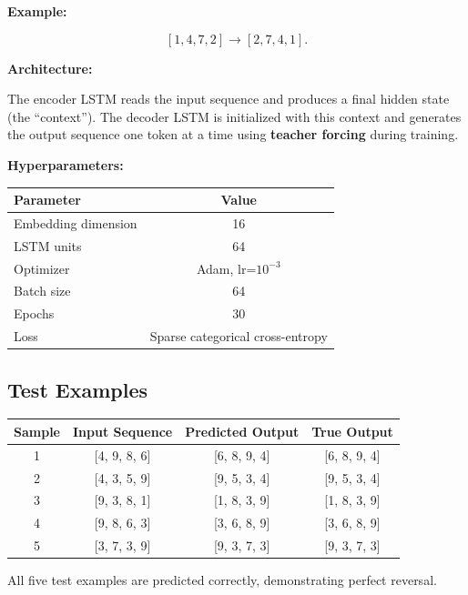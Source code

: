 \documentclass[10pt]{article}
\begin{document}
\textbf{Example:}

\[
[1,4,7,2] \rightarrow [2,7,4,1].
\]

\textbf{Architecture:}

The encoder LSTM reads the input sequence and produces a final hidden state (the ``context''). 
The decoder LSTM is initialized with this context and generates the output sequence one token at a time 
using \textbf{teacher forcing} during training.

\textbf{Hyperparameters:}

\begin{center}
\begin{tabular}{|l|c|}
\hline
\textbf{Parameter} & \textbf{Value}\\
\hline
Embedding dimension & 16\\
LSTM units & 64\\
Optimizer & Adam, lr=$10^{-3}$\\
Batch size & 64\\
Epochs & 30\\
Loss & Sparse categorical cross-entropy\\
\hline
\end{tabular}
\end{center}

\vspace{3mm}


\subsection*{Test Examples}

\begin{center}
\begin{tabular}{|c|c|c|c|}
\hline
\textbf{Sample} & \textbf{Input Sequence} & \textbf{Predicted Output} & \textbf{True Output}\\
\hline
1 & [4, 9, 8, 6] & [6, 8, 9, 4] & [6, 8, 9, 4]\\
2 & [4, 3, 5, 9] & [9, 5, 3, 4] & [9, 5, 3, 4]\\
3 & [9, 3, 8, 1] & [1, 8, 3, 9] & [1, 8, 3, 9]\\
4 & [9, 8, 6, 3] & [3, 6, 8, 9] & [3, 6, 8, 9]\\
5 & [3, 7, 3, 9] & [9, 3, 7, 3] & [9, 3, 7, 3]\\
\hline
\end{tabular}
\end{center}

All five test examples are predicted correctly, demonstrating perfect reversal.
\end{document}
